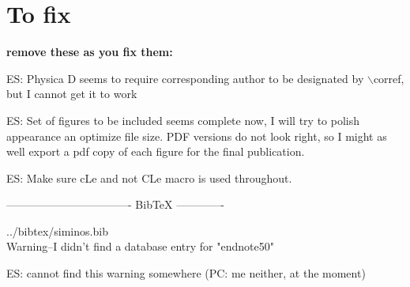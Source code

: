 
\section*{To fix}

{\bf remove these as you fix them:}

ES: Physica D seems to require corresponding author to be designated by $\backslash$corref, but I cannot get it to work

ES: Set of figures to be included seems complete now, I will try to polish appearance an optimize file size.
    PDF versions do not look right, so I might as well export a pdf copy of each figure for the final publication.

ES: Make sure cLe and not CLe macro is used throughout.

---------------------------------- BibTeX -------------

../bibtex/siminos.bib
\\
Warning--I didn't find a database entry for "endnote50"

ES: cannot find this warning somewhere 
(PC: me neither, at the moment)